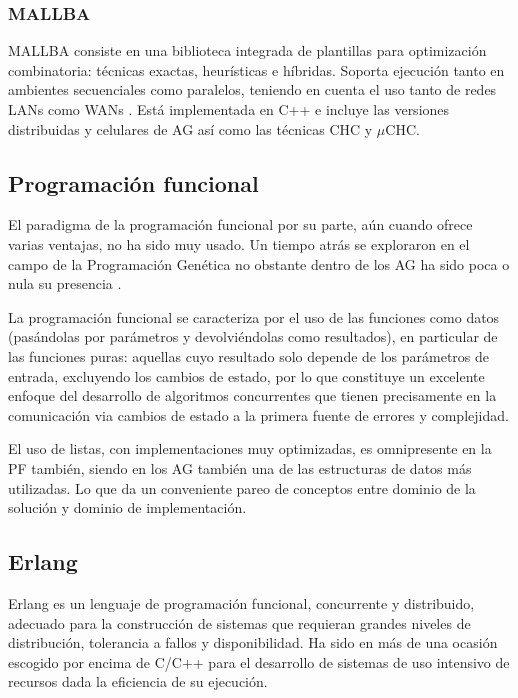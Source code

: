 \documentclass[runningheads]{llncs}
\begin{document}
\subsubsection{MALLBA}

MALLBA consiste en una biblioteca integrada de plantillas para optimización combinatoria: técnicas exactas, heurísticas e híbridas. Soporta ejecución tanto en ambientes secuenciales como paralelos, teniendo en cuenta el uso tanto de redes LANs como WANs \cite{MALLBA}. Está implementada en C++ e incluye las versiones distribuidas y celulares de AG así como las técnicas CHC y $\mu$CHC.

\subsection{Programación funcional}

El paradigma de la programación funcional por su parte, aún cuando ofrece varias ventajas, no ha sido muy usado. Un tiempo atrás se exploraron en el campo de la Programación Genética \cite{Briggs:2008:FGP:1375341.1375345,Huelsbergen:1996:TSE:1595536.1595579,walsh:1999:AFSFESIHLP} no obstante dentro de los AG ha sido poca o nula su presencia \cite{Hawkins:2001:GFG:872017.872197}.

La programación funcional se caracteriza por el uso de las funciones como datos (pasándolas por parámetros y devolviéndolas como resultados), en particular de las funciones puras: aquellas cuyo resultado solo depende de los parámetros de entrada, excluyendo los cambios de estado, por lo que constituye un excelente enfoque del desarrollo de algoritmos concurrentes que tienen precisamente en la comunicación via cambios de estado a la primera fuente de errores y complejidad.

El uso de listas, con implementaciones muy optimizadas, es omnipresente en la PF también, siendo en los AG también una de las estructuras de datos más utilizadas. Lo que da un conveniente pareo de conceptos entre dominio de la solución y dominio de implementación.

\subsection{Erlang}


Erlang es un lenguaje de programación funcional, concurrente y distribuido, adecuado para la construcción de sistemas que requieran grandes niveles de distribución, tolerancia a fallos y disponibilidad. Ha sido en más de una ocasión escogido por encima de C/C++ para el desarrollo de sistemas de uso intensivo de recursos \cite{Cesarini2009} dada la eficiencia de su ejecución.
\end{document}
